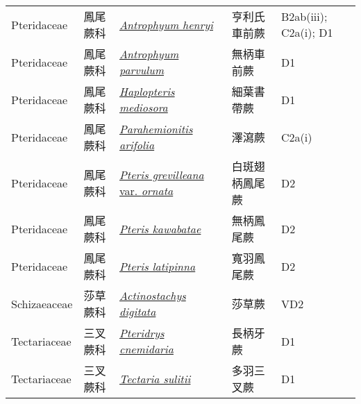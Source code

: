 {\begin{longtable}{p{2.5cm}p{2cm}p{5cm}p{2.5cm}p{3cm}}
    Pteridaceae & 鳳尾蕨科 & \href{http://www.theplantlist.org/tpl1.1/search?q=Antrophyum+henryi}{\textit{Antrophyum henryi} } & 亨利氏車前蕨 & B2ab(iii); C2a(i); D1 \index{Antrophyum@\textit{Antrophyum}!henryi@\textit{henryi}}  \index{亨利氏車前蕨} \\
    Pteridaceae & 鳳尾蕨科 & \href{http://www.theplantlist.org/tpl1.1/search?q=Antrophyum+parvulum}{\textit{Antrophyum parvulum} } & 無柄車前蕨 & D1 \index{Antrophyum@\textit{Antrophyum}!parvulum@\textit{parvulum}}  \index{無柄車前蕨} \\
    Pteridaceae & 鳳尾蕨科 & \href{http://www.theplantlist.org/tpl1.1/search?q=Haplopteris+mediosora}{\textit{Haplopteris mediosora} } & 細葉書帶蕨 & D1 \index{Haplopteris@\textit{Haplopteris}!mediosora@\textit{mediosora}}  \index{細葉書帶蕨} \\
    Pteridaceae & 鳳尾蕨科 & \href{http://www.theplantlist.org/tpl1.1/search?q=Parahemionitis+arifolia}{\textit{Parahemionitis arifolia} } & 澤瀉蕨 & C2a(i) \index{Parahemionitis@\textit{Parahemionitis}!arifolia@\textit{arifolia}}  \index{澤瀉蕨} \\
    Pteridaceae & 鳳尾蕨科 & \href{http://www.theplantlist.org/tpl1.1/search?q=Pteris+grevilleana+var.+ornata}{\textit{Pteris grevilleana} var. \textit{ornata} } & 白斑翅柄鳳尾蕨 & D2 \index{Pteris@\textit{Pteris}!grevilleana@\textit{grevilleana}!var. ornata@var. \textit{ornata}}  \index{白斑翅柄鳳尾蕨} \\
    Pteridaceae & 鳳尾蕨科 & \href{http://www.theplantlist.org/tpl1.1/search?q=Pteris+kawabatae}{\textit{Pteris kawabatae} } & 無柄鳳尾蕨 & D2 \index{Pteris@\textit{Pteris}!kawabatae@\textit{kawabatae}}  \index{無柄鳳尾蕨} \\
    Pteridaceae & 鳳尾蕨科 & \href{http://www.theplantlist.org/tpl1.1/search?q=Pteris+latipinna}{\textit{Pteris latipinna} } & 寬羽鳳尾蕨 & D2 \index{Pteris@\textit{Pteris}!latipinna@\textit{latipinna}}  \index{寬羽鳳尾蕨} \\
    Schizaeaceae & 莎草蕨科 & \href{http://www.theplantlist.org/tpl1.1/search?q=Actinostachys+digitata}{\textit{Actinostachys digitata} } & 莎草蕨 & VD2 \index{Actinostachys@\textit{Actinostachys}!digitata@\textit{digitata}}  \index{莎草蕨} \\
    Tectariaceae & 三叉蕨科 & \href{http://www.theplantlist.org/tpl1.1/search?q=Pteridrys+cnemidaria}{\textit{Pteridrys cnemidaria} } & 長柄牙蕨 & D1 \index{Pteridrys@\textit{Pteridrys}!cnemidaria@\textit{cnemidaria}}  \index{長柄牙蕨} \\
    Tectariaceae & 三叉蕨科 & \href{http://www.theplantlist.org/tpl1.1/search?q=Tectaria+sulitii}{\textit{Tectaria sulitii} } & 多羽三叉蕨 & D1 \index{Tectaria@\textit{Tectaria}!sulitii@\textit{sulitii}}  \index{多羽三叉蕨} \\

\end{longtable}}
